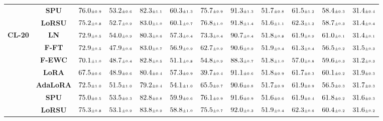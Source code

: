 \begin{table}
\begin{center}
\begin{small}
\begin{tabular}{l c c c c c c c c c c c}
& \textbf{SPU} & $76.0 \mtiny{\pm 0.9}$ & $53.2 \mtiny{\pm 0.6}$ & $82.3 \mtiny{\pm 1.1}$ & $60.3 \mtiny{\pm 1.3}$ & $75.7 \mtiny{\pm 0.9}$ & $91.3 \mtiny{\pm 1.3}$ & $51.7 \mtiny{\pm 0.8}$ & $61.5 \mtiny{\pm 1.2}$ & $58.4 \mtiny{\pm 0.3}$ & $31.4 \mtiny{\pm 0.4}$ \\
& \textbf{LoRSU} & $75.2 \mtiny{\pm 0.8}$ & $52.7 \mtiny{\pm 0.9}$ & $83.0 \mtiny{\pm 1.0}$ & $60.1 \mtiny{\pm 0.7}$ & $76.8 \mtiny{\pm 1.0}$ & $91.8 \mtiny{\pm 1.4}$ & $51.6 \mtiny{\pm 1.1}$ & $62.3 \mtiny{\pm 1.2}$ & $58.7 \mtiny{\pm 0.3}$ & $31.4 \mtiny{\pm 0.4}$ \\
\midrule
\multirow{7}{*}{\textbf{CL-20}} & \textbf{LN} & $72.9 \mtiny{\pm 0.5}$ & $54.0 \mtiny{\pm 0.9}$ & $80.3 \mtiny{\pm 0.6}$ & $57.3 \mtiny{\pm 0.4}$ & $73.3 \mtiny{\pm 0.4}$ & $90.7 \mtiny{\pm 0.4}$ & $51.8 \mtiny{\pm 0.8}$ & $61.9 \mtiny{\pm 0.9}$ & $61.0 \mtiny{\pm 0.1}$ & $31.4 \mtiny{\pm 0.1}$ \\
& \textbf{F-FT} & $72.9 \mtiny{\pm 0.5}$ & $47.9 \mtiny{\pm 0.6}$ & $83.0 \mtiny{\pm 0.7}$ & $56.9 \mtiny{\pm 0.9}$ & $62.7 \mtiny{\pm 0.9}$ & $90.6 \mtiny{\pm 0.9}$ & $51.9 \mtiny{\pm 0.4}$ & $61.3 \mtiny{\pm 0.4}$ & $56.5 \mtiny{\pm 0.2}$ & $31.5 \mtiny{\pm 0.3}$ \\
& \textbf{F-EWC} & $70.1 \mtiny{\pm 1.0}$ & $48.7 \mtiny{\pm 0.4}$ & $82.8 \mtiny{\pm 0.5}$ & $51.1 \mtiny{\pm 0.8}$ & $54.8 \mtiny{\pm 0.9}$ & $88.3 \mtiny{\pm 0.7}$ & $51.8 \mtiny{\pm 1.0}$ & $57.0 \mtiny{\pm 0.8}$ & $59.6 \mtiny{\pm 0.3}$ & $31.2 \mtiny{\pm 0.3}$ \\
& \textbf{LoRA} & $67.5 \mtiny{\pm 0.6}$ & $48.9 \mtiny{\pm 0.6}$ & $80.4 \mtiny{\pm 0.4}$ & $57.3 \mtiny{\pm 0.9}$ & $39.7 \mtiny{\pm 0.4}$ & $91.1 \mtiny{\pm 0.6}$ & $51.8 \mtiny{\pm 0.9}$ & $61.7 \mtiny{\pm 0.3}$ & $60.1 \mtiny{\pm 0.2}$ & $31.9 \mtiny{\pm 0.3}$ \\
& \textbf{AdaLoRA} & $72.5 \mtiny{\pm 1.0}$ & $51.5 \mtiny{\pm 1.0}$ & $79.2 \mtiny{\pm 0.4}$ & $54.1 \mtiny{\pm 1.0}$ & $65.5 \mtiny{\pm 0.7}$ & $90.6 \mtiny{\pm 0.8}$ & $51.7 \mtiny{\pm 0.9}$ & $61.9 \mtiny{\pm 0.9}$ & $56.5 \mtiny{\pm 0.3}$ & $31.7 \mtiny{\pm 0.3}$ \\
& \textbf{SPU} & $75.0 \mtiny{\pm 0.5}$ & $53.5 \mtiny{\pm 0.3}$ & $82.8 \mtiny{\pm 0.8}$ & $59.9 \mtiny{\pm 0.6}$ & $76.1 \mtiny{\pm 0.9}$ & $91.6 \mtiny{\pm 0.9}$ & $51.6 \mtiny{\pm 0.6}$ & $61.9 \mtiny{\pm 0.4}$ & $61.8 \mtiny{\pm 0.2}$ & $31.6 \mtiny{\pm 0.3}$ \\
& \textbf{LoRSU} & $75.3 \mtiny{\pm 0.8}$ & $53.1 \mtiny{\pm 0.9}$ & $83.8 \mtiny{\pm 0.9}$ & $58.8 \mtiny{\pm 1.0}$ & $75.5 \mtiny{\pm 0.7}$ & $92.0 \mtiny{\pm 0.3}$ & $51.9 \mtiny{\pm 0.4}$ & $62.3 \mtiny{\pm 0.6}$ & $60.4 \mtiny{\pm 0.2}$ & $31.6 \mtiny{\pm 0.2}$ \\

\end{tabular}
\end{small}
\end{center}
\end{table}
